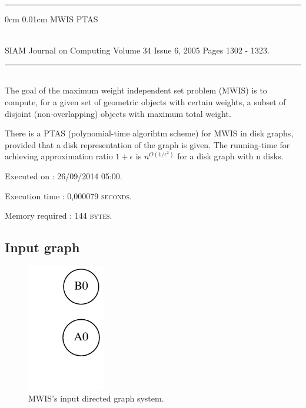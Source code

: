 \documentclass{article}
\makeatletter
\newcommand{\HRule}{\noindent\rule{\linewidth}{0.5mm}}
\renewcommand\section{\@startsection
  {section}{1}{0mm}%
  {0cm}%
  {0.01cm}%
  {\Huge\bfseries\color{black}}}%
\makeatother
\begin{document}
\HRule

\section{MWIS PTAS}

 \\[0.4cm]
{\LARGE SIAM Journal on Computing Volume 34 Issue 6, 2005 Pages 1302 - 1323.}\\[0.4cm]
\HRule \\[0.5cm]
\indent The goal of the maximum weight independent set problem (MWIS) is to compute, for a given set of geometric objects with certain weights, a subset of disjoint (non-overlapping) objects with maximum total weight.

There is a PTAS (polynomial-time algorihtm scheme) for MWIS in disk graphs, provided that a disk representation of the graph is given. 
The running-time for achieving approximation ratio $1+\epsilon$ 
is $n^{O(1/\epsilon^{2})}$ for a disk graph with n disks.\\[0.5cm]
\begin{compactitem}
\item Executed on : \textsc{26/09/2014 05:00}. 
\item Execution time : \textsc{0,000079 seconds}. 
\item Memory required : \textsc{144 bytes}. 
\end{compactitem}

\subsection{Input graph}
\begin{figure}[H]\centering
\noindent\includegraphics[height=210px]{reports/graph.pdf}
\caption{MWIS's input directed graph system.}
\end{figure}
\end{document}
